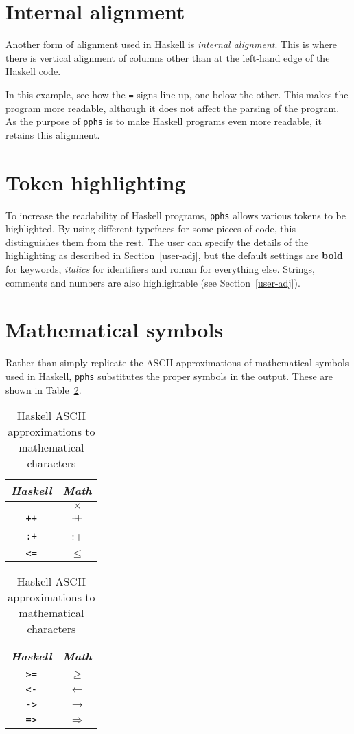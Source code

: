 \section{Internal alignment}

Another form of alignment used in Haskell is {\em internal alignment}.  This is where
there is vertical alignment of columns other than at the left-hand edge of the
Haskell code.
\begin{quote}

\end{quote}
In this example, see how the {\tt =} signs line up, one below the other.  This makes
the program more readable, although it does not affect the parsing of the program.
As the purpose of {\tt pphs} is to make Haskell programs even more readable, it
retains this alignment.

\section{Token highlighting}

To increase the readability of Haskell programs, {\tt pphs} allows various tokens
to be highlighted.  By using different typefaces for some pieces of code, this
distinguishes them from the rest.  The user can specify the details of the highlighting as
described in Section~\ref{user-adj}, but the default settings are {\bf bold} for
keywords, {\it italics} for identifiers and {\rm roman} for everything else.  Strings,
comments and numbers are also highlightable (see Section~\ref{user-adj}).

\section{Mathematical symbols}

Rather than simply replicate the ASCII approximations of mathematical symbols
used in Haskell, {\tt pphs}
substitutes the proper symbols in the output.  These are shown in Table~\ref{maths-sym}.
\begin{table}
\begin{center}
\begin{tabular}[t]{|c|c|} \hline
{\em Haskell\/} & {\em Math\/} \\ \hline
{\tt *} & $\times$ \\
{\tt ++} & {\hbox{$+\mkern-7.5mu+$}} \\
{\tt :+} & {:}{+} \\
{\tt <=} & $\leq$ \\ \hline
\end{tabular} \hskip3mm \begin{tabular}[t]{|c|c|} \hline
{\em Haskell\/} & {\em Math\/} \\ \hline
{\tt >=} & $\geq$ \\
{\tt <-} & $\leftarrow$ \\
{\tt ->} & $\rightarrow$ \\
{\tt =>} & $\Rightarrow$ \\ \hline
\end{tabular}
\end{center}
\caption{Haskell ASCII approximations to mathematical characters} \label{maths-sym}
\end{table}

